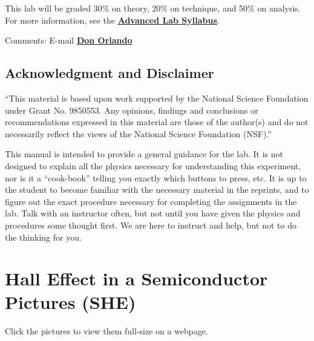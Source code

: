 \documentclass{../lab}
\begin{document}
\noindent This lab will be graded 30\% on theory, 20\% on technique, and 50\% on analysis. For more information, see the \href{\AdvancedLabSyllabus}{\textbf{Advanced Lab Syllabus}}.

Comments: E-mail \href{\MailDonOrlando}{\textbf{Don Orlando}}

\subsection{Acknowledgment and Disclaimer}

``This material is based upon work supported by the National Science Foundation under Grant No. 9850553. Any opinions, findings and conclusions or recommendations expressed in this material are those of the author(s) and do not necessarily reflect the views of the National Science Foundation (NSF).''

This manual is intended to provide a general guidance for the lab. It is not designed to explain all the physics necessary for understanding this experiment, nor is it a ``cook-book'' telling you exactly which buttons to press, etc. It is up to the student to become familiar with the necessary material in the reprints, and to figure out the exact procedure necessary for completing the assignments in the lab. Talk with an instructor often, but not until you have given the physics and procedures some thought first. We are here to instruct and help, but not to do the thinking for you.

\section{Hall Effect in a Semiconductor Pictures (SHE)}

\noindent Click the pictures to view them full-size on a webpage. \\
\end{document}
